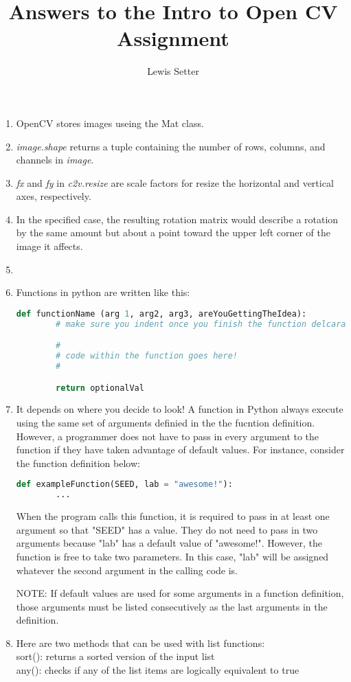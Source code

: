 \documentclass{article}
\title{Answers to the Intro to Open CV Assignment}
\author{Lewis Setter}
\begin{document}
\maketitle

\begin{enumerate}
\item
OpenCV stores images useing the Mat class.

\item
\textit{image.shape} returns a tuple containing the number of rows, columns, and 
channels in \textit{image}.

\item
\textit{fx} and \textit{fy} in \textit{c2v.resize} are scale factors for resize the
horizontal and vertical axes, respectively.

\item
In the specified case, the resulting rotation matrix would describe a rotation by the
same amount but about a point toward the upper left corner of the image it affects.

\item

\item
Functions in python are written like this:
\begin{lstlisting}[language=Python]
    def functionName (arg 1, arg2, arg3, areYouGettingTheIdea):
        # make sure you indent once you finish the function delcaration

        #
        # code within the function goes here!
        #

        return optionalVal
\end{lstlisting}
\item
It depends on where you decide to look!
A function in Python always execute using the same set of arguments definied in the
the fucntion definition. However, a programmer does not have to pass in every argument
to the function if they have taken advantage of default values. For instance, consider
the function definition below:
\begin{lstlisting}[language=Python]
    def exampleFunction(SEED, lab = "awesome!"):
        ...
\end{lstlisting}
When the program calls this function, it is required to pass in at least one argument
so that "SEED" has a value. They do not need to pass in two arguments because "lab"
has a default value of "awesome!". However, the function is free to take two parameters.
In this case, "lab" will be assigned whatever the second argument in the calling code is.

NOTE: If default values are used for some arguments in a function definition, those
arguments must be listed consecutively as the last arguments in the definition.

\item
Here are two methods that can be used with list functions:
\\
sort(): returns a sorted version of the input list\\
any(): checks if any of the list items are logically equivalent to true\\

\end{enumerate}
\end{document}
